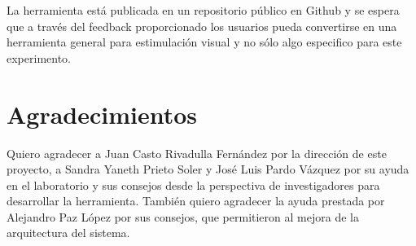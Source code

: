 \documentclass[conference]{IEEEtran}
\begin{document}
La herramienta está publicada en un repositorio público en Github\cite{stimpackrepo} y se espera que a través del feedback proporcionado los usuarios pueda convertirse en una herramienta general para estimulación visual y no sólo algo especifico para este experimento.

\section{Agradecimientos}

Quiero agradecer a Juan Casto Rivadulla Fernández por la dirección de este proyecto, a Sandra Yaneth Prieto Soler y José Luis Pardo Vázquez por su ayuda en el laboratorio y sus consejos desde la perspectiva de investigadores para desarrollar la herramienta. 
También quiero agradecer la ayuda prestada por Alejandro Paz López por sus consejos, que permitieron al mejora de la arquitectura del sistema.
\end{document}
